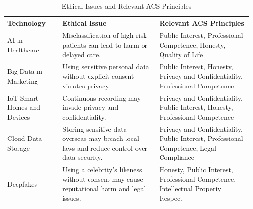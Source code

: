 \begin{table}[htbp]
\centering
\renewcommand{\arraystretch}{1.35}
\begin{tabular}{|p{3cm}|p{6cm}|p{6cm}|}
\hline
\textbf{Technology} & \textbf{Ethical Issue} & \textbf{Relevant ACS Principles} \\
\hline

AI in Healthcare &
Misclassification of high-risk patients can lead to harm or delayed care. &
Public Interest, Professional Competence, Honesty, Quality of Life \\
\hline

Big Data in Marketing &
Using sensitive personal data without explicit consent violates privacy. &
Public Interest, Honesty, Privacy and Confidentiality, Professional Competence \\
\hline

IoT Smart Homes and Devices &
Continuous recording may invade privacy and confidentiality. &
Privacy and Confidentiality, Public Interest, Honesty, Professional Competence \\
\hline

Cloud Data Storage &
Storing sensitive data overseas may breach local laws and reduce control over data security. &
Privacy and Confidentiality, Public Interest, Professional Competence, Legal Compliance \\
\hline

Deepfakes &
Using a celebrity's likeness without consent may cause reputational harm and legal issues. &
Honesty, Public Interest, Professional Competence, Intellectual Property Respect \\
\hline

\end{tabular}
\caption{Ethical Issues and Relevant ACS Principles}
\end{table}